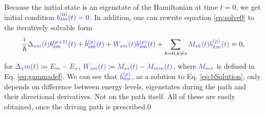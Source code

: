 Because the initial state is an eigenstate of the Hamiltonian at time $t=0$, we get initial condition $\blue{b_{sm}^{(0)}(t)=0}$. In addition, one can rewrite equation \ref{eq:solve0} to the iteratively solvable form
\begin{equation}
    \frac{i}{\hbar}\bluee{\Delta_{sm}(t)}\blue{b_{sm}^{(p+1)}(t)}+\blue{\dot b_{sm}^{(p)}(t)}+\bluee{W_{sm}(t)} \blue{b_{sm}^{(p)}(t)}+\sum_{k=0,k\neq s}\bluee{M_{sk}(t)}\bluee{b_{km}^{(p)}(t)}=0,
    \label{eq:bSolution}
\end{equation}
for $\bluee{\Delta_sm(t)}\coloneqq \bluee{E_m-E_s}$, $\bluee{W_{sm}(t)}\coloneqq \bluee{M_{ss}(t)}-\bluee{M_{mm}(t)}$, where $\bluee{M_{ms}}$ is defined in Eq. \ref{eq:gammadef}. We can see that $\blue{b_{ms}^{(p)}}$, as a solution to Eq. \ref{eq:bSolution}, only depends on difference between energy levels, eigenstates during the path and their directional derivatives. Not on the path itself. All of these are easily obtained, once the driving path is prescribed.0




















